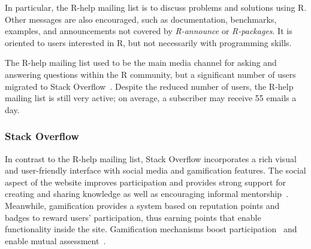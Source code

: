 \documentclass{sig-alternate-05-2015}
\begin{document}
In particular, the R-help mailing list is to discuss problems and solutions using R. 
Other messages are also encouraged, such as documentation, benchmarks, examples, and announcements not covered by \emph{R-announce} or \emph{R-packages}.
It is oriented to users interested in R, but not necessarily with programming skills.

	The R-help mailing list used to be the main media channel for asking and answering questions within the R community, but a significant number of users migrated to Stack Overflow~\cite{Vasilescu2014c}.
	Despite the reduced number of users, the R-help mailing list is still very active; on average, a subscriber may receive 55 emails a day.

\subsubsection{Stack Overflow}
\label{subsec:Rtag}

	In contrast to the R-help mailing list, Stack Overflow incorporates a rich visual and user-friendly interface with social media and gamification features.
	The social aspect of the website improves participation and provides strong support for creating and sharing knowledge as well as encouraging informal mentorship~\cite{Jenkins2009, Storey2014}.
	Meanwhile, gamification provides a system based on reputation points and badges to reward users' participation, thus earning points that enable functionality inside the site.
	Gamification mechanisms boost participation~\cite{Vasilescu2014} and enable mutual assessment~\cite{Singer2013}.

\end{document}

